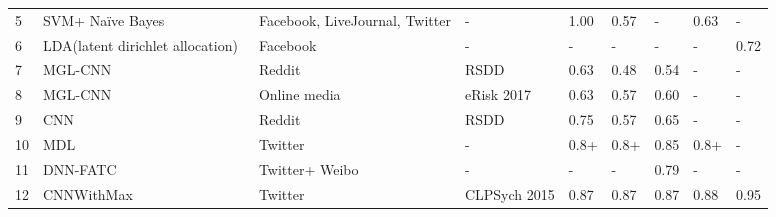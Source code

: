 \begin{table*}
\begin{tabular}{l|l|ll|lllll}
5                                       & SVM+ Naïve Bayes~\cite{aldarwish2017predicting}                & Facebook, LiveJournal, Twitter & -                           & 1.00                          & 0.57                       & -                            & 0.63                         & -                       \\
6                                       & LDA(latent dirichlet allocation)~\cite{eichstaedt2018facebook} & Facebook                       & -                           & -                             & -                          & -                            & -                            & 0.72                    \\
7                                       & MGL-CNN~\cite{rao2020mgl}                                      & Reddit                         & RSDD                        & 0.63                          & 0.48                       & 0.54                         & -                            & -                       \\
8                                       & MGL-CNN~\cite{rao2020mgl}                                      & Online media                   & eRisk 2017                  & 0.63                          & 0.57                       & 0.60                         & -                            & -                       \\
9                                       & CNN~\cite{yates2017depression}                                 & Reddit                         & RSDD                        & 0.75                          & 0.57                       & 0.65                         & -                            & -                       \\
10                                      & MDL~\cite{shen2017depression}                                  & Twitter                        & -                           & 0.8+                          & 0.8+                       & 0.85                         & 0.8+                         & -                       \\
11                                      & DNN-FATC~\cite{shen2018cross}                                  & Twitter+ Weibo                 & -                           & -                             & -                          & 0.79                         & -                            & -                       \\
12                                      & CNNWithMax~\cite{orabi2018deep}                                & Twitter                        & CLPSych 2015                & 0.87                          & 0.87                       & 0.87                         & 0.88                         & 0.95                    \\

\end{tabular}
\end{table*}

